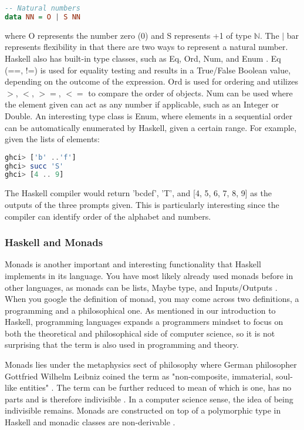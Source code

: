 \documentclass{article}
\begin{document}
\begin{lstlisting}[language=haskell]
-- Natural numbers
data NN = O | S NN
\end{lstlisting}

\noindent 
where O represents the number zero (0) and S represents +1 of type $\mathbb N$. The $|$ bar represents flexibility in that there are two ways to represent a natural number. Haskell also has built-in type classes, such as Eq, Ord, Num, and Enum \cite{LYH Types}. Eq (==, !=) is used for equality testing and results in a True/False Boolean value, depending on the outcome of the expression. Ord is used for ordering and utilizes $>$, $<$, $>=$, $<=$ to compare the order of objects. Num can be used where the element given can act as any number if applicable, such as an Integer or Double. An interesting type class is Enum, where elements in a sequential order can be automatically enumerated by Haskell, given a certain range. For example, given the lists of elements:

\begin{lstlisting}[language=haskell]
ghci> ['b' ..'f']
ghci> succ 'S'
ghci> [4 .. 9] 
\end{lstlisting}

\noindent
The Haskell compiler would return 'bcdef', 'T', and [4, 5, 6, 7, 8, 9] as the outputs of the three prompts given. This is particularly interesting since the compiler can identify order of the alphabet and numbers. 

\subsubsection{Haskell and Monads}

Monads is another important and interesting functionality that Haskell implements in its language. You have most likely already used monads before in other languages, as monads can be lists, Maybe type, and Inputs/Outputs \cite{Haskell.org Monads}. When you google the definition of monad, you may come across two definitions, a programming and a philosophical one. As mentioned in our introduction to Haskell, programming languages expands a programmers mindset to focus on both the theoretical and philosophical side of computer science, so it is not surprising that the term is also used in programming and theory.

\medskip\noindent
Monads lies under the metaphysics sect of philosophy where German philosopher Gottfried Wilhelm Leibniz coined the term as "non-composite, immaterial, soul-like entities" \cite{IEOP}. The term can be further reduced to mean of which is one, has no parts and is therefore indivisible \cite{IEOP}. In a computer science sense, the idea of being indivisible remains. Monads are constructed on top of a polymorphic type in Haskell and monadic classes are non-derivable \cite{Haskell Monads}. 
\end{document}
